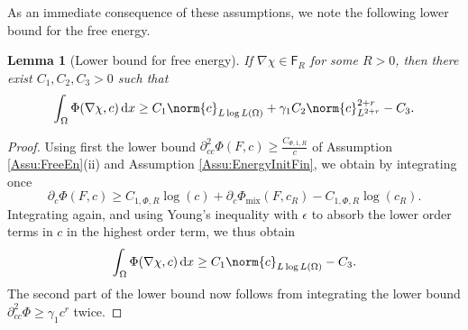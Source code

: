 \documentclass[a4paper,12pt]{article}
\newcommand{\mix}{\mathrm{mix}}
\newcommand{\pl}{\partial}
\newcommand{\dx}{\mathrm{\,d}x}
\theoremstyle{plain}
\newtheorem{Lemma}[Th]{Lemma}
\theoremstyle{definition}
\numberwithin{equation}{section}
\begin{document}
As an immediate consequence of these assumptions, we note the following lower bound for the free energy.			
\begin{Lemma}[Lower bound for free energy]
\label{Lemma:BelowEstimatePhiMix}
%
%
%
%
If %
$\nabla\chi\in \mathsf{F}_R$ for some $R>0$, then there exist $C_1, C_2, C_3>0$ such that
\begin{equation}
	\label{Eqn:LowerBoundPhiMix}
\int_\Omega \Phi(\nabla\chi,c)\dx \geq C_1\norm{c}_{L\log L(\Omega)} + \gamma_1C_2\norm{c}_{L^{2+r}}^{2+r} - C_3.
\end{equation}
\end{Lemma}		
\begin{proof}
Using first the lower bound $\pl_{cc}^2\Phi(F,c)\geq \frac{C_{\Phi,1,R}}{c}$ of Assumption \ref{Assu:FreeEn}(ii) and Assumption \ref{Assu:EnergyInitFin}, we obtain by integrating once 
\[
\pl_c\Phi(F,c) \geq C_{1,\Phi,R}\log(c) + \pl_c\Phi_\mix(F,c_R) - C_{1,\Phi,R}\log(c_R).
\]
Integrating again, and using Young's inequality with $\epsilon$ to absorb the lower order terms in $c$ in the highest order term, we thus obtain
\[
\int_\Omega \Phi(\nabla\chi,c)\dx \geq C_1\norm{c}_{L\log L(\Omega)} - C_3.
\]
The second part of the lower bound now follows from integrating the lower bound $\pl^2_{cc}\Phi \geq \gamma_1c^r$ twice.
\end{proof}
\end{document}
